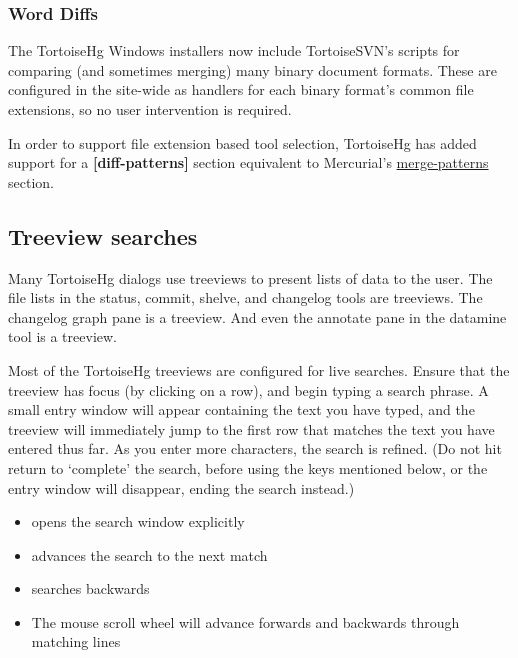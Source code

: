 \documentclass[letterpaper,10pt,english]{manual}
\begin{document}
\subsubsection{Word Diffs}

The TortoiseHg Windows installers now include TortoiseSVN's scripts for
comparing (and sometimes merging) many binary document formats.  These
are configured in the site-wide  as handlers for
each binary format's common file extensions, so no user intervention is
required.

In order to support file extension based tool selection, TortoiseHg has
added support for a \textbf{{[}diff-patterns{]}} section equivalent to Mercurial's
\href{http://www.selenic.com/mercurial/hgrc.5.html\#merge-patterns}{merge-patterns}
section.


\subsection{Treeview searches}

Many TortoiseHg dialogs use treeviews to present lists of data to the
user. The file lists in the status, commit, shelve, and changelog tools
are treeviews. The changelog graph pane is a treeview. And even the
annotate pane in the datamine tool is a treeview.

Most of the TortoiseHg treeviews are configured for live searches.
Ensure that the treeview has focus (by clicking on a row), and begin
typing a search phrase. A small entry window will appear containing the
text you have typed, and the treeview will immediately jump to the first
row that matches the text you have entered thus far. As you enter more
characters, the search is refined. (Do not hit return to `complete' the
search, before using the keys mentioned below, or the entry window will
disappear, ending the search instead.)
\begin{itemize}
\item {} 
 opens the search window explicitly

\item {} 
 advances the search to the next match

\item {} 
 searches backwards

\item {} 
The mouse scroll wheel will advance forwards and backwards through
matching lines

\end{itemize}
\end{document}
